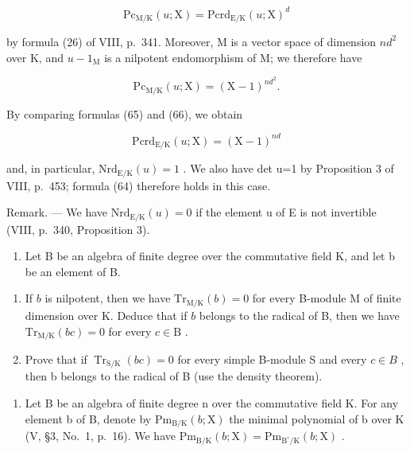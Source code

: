 \[
\mathrm{Pc} _ {\mathrm{M/K}} (u; \mathrm{X}) = \mathrm{Pcrd} _ {\mathrm{E/K}} (u; \mathrm{X}) ^ {d}\tag{65}
\]

by formula (26) of VIII, p.~341. Moreover, M is a vector space of dimension \(nd^2\) over K, and \(u - 1_{\mathrm{M}}\) is a nilpotent endomorphism of M; we therefore have

\[
\mathrm{Pc} _ {\mathrm{M/K}} (u; \mathrm{X}) = (\mathrm{X} - 1) ^ {n d ^ {2}}.\tag{66}
\]

By comparing formulas (65) and (66), we obtain

\[
\mathrm{Pcrd} _ {\mathrm{E/K}} (u; \mathrm{X}) = (\mathrm{X} - 1) ^ {n d}\tag{67}
\]

and, in particular, \(\mathrm{Nrd}_{\mathrm{E}/\mathrm{K}}(u)=1\) . We also have det u=1 by Proposition 3 of VIII, p.~453; formula (64) therefore holds in this case.

Remark. --- We have \(\mathrm{Nrd}_{\mathrm{E}/\mathrm{K}}(u)=0\) if the element u of E is not invertible (VIII, p.~340, Proposition 3).


\begin{enumerate}
\def\labelenumi{\arabic{enumi})}
\tightlist
\item
  Let B be an algebra of finite degree over the commutative field K, and let b be an element of B.
\end{enumerate}

\begin{enumerate}
\def\labelenumi{\alph{enumi})}
\item
  If \(b\) is nilpotent, then we have \(\mathrm{Tr}_{\mathrm{M / K}}(b) = 0\) for every B-module M of finite dimension over K. Deduce that if \(b\) belongs to the radical of B, then we have \(\mathrm{Tr}_{\mathrm{M / K}}(bc) = 0\) for every \(c \in \mathrm{B}\) .
\item
  Prove that if \(\operatorname{Tr}_{\mathrm{S}/\mathrm{K}}(bc)=0\) for every simple B-module S and every \(c\in B\) , then b belongs to the radical of B (use the density theorem).
\end{enumerate}

\begin{enumerate}
\def\labelenumi{\arabic{enumi})}
\setcounter{enumi}{1}
\tightlist
\item
  Let B be an algebra of finite degree n over the commutative field K. For any element b of B, denote by \(\mathrm{Pm}_{\mathrm{B}/\mathrm{K}}(b;\mathrm{X})\) the minimal polynomial of b over K (V, §3, No.~1, p.~16). We have \(\mathrm{Pm}_{\mathrm{B}/\mathrm{K}}(b;\mathrm{X})=\mathrm{Pm}_{\mathrm{B}^{\circ}/\mathrm{K}}(b;\mathrm{X})\) .
\end{enumerate}

